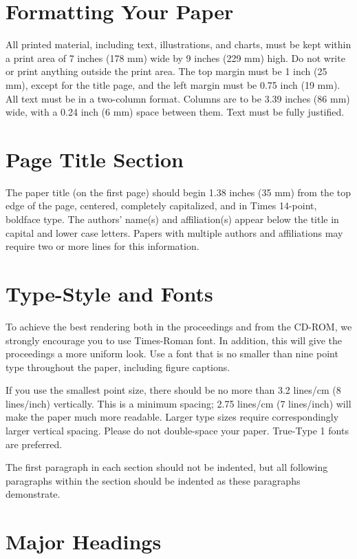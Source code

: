 \documentclass{article}
\begin{document}
\section{Formatting Your Paper}

All printed material, including text, illustrations, and charts, must be kept within a print area of 7 inches (178 mm) wide by 9 inches (229 mm) high. Do not write or print anything outside the print area. The top margin must be 1 inch (25 mm), except for the title page, and the left margin must be 0.75 inch (19 mm).  All text must be in a two-column format. Columns are to be 3.39 inches (86 mm) wide, with a 0.24 inch (6 mm) space between them. Text must be fully justified.

\section{Page Title Section}

The paper title (on the first page) should begin 1.38 inches (35 mm) from the top edge of the page, centered, completely capitalized, and in Times 14-point, boldface type.  The authors' name(s) and affiliation(s) appear below the title in capital and lower case letters.  Papers with multiple authors and affiliations may require two or more lines for this information.

\section{Type-Style and Fonts}

To achieve the best rendering both in the proceedings and from the CD-ROM, we strongly encourage you to use Times-Roman font. In addition, this will give the proceedings a more uniform look. Use a font that is no smaller than nine point type throughout the paper, including figure captions.

If you use the smallest point size, there should be no more than 3.2 lines/cm (8 lines/inch) vertically. This is a minimum spacing; 2.75 lines/cm (7 lines/inch) will make the paper much more readable. Larger type sizes require correspondingly larger vertical spacing. Please do not double-space your paper. True-Type 1 fonts are preferred.

The first paragraph in each section should not be indented, but all following paragraphs within the section should be indented as these paragraphs demonstrate.

\section{Major Headings}
\end{document}

